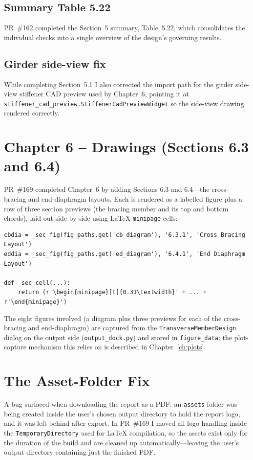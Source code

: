 \subsection{Summary Table 5.22}
PR~\#162 completed the Section~5 summary, Table~5.22, which consolidates the individual checks
into a single overview of the design's governing results.

\subsection{Girder side-view fix}
While completing Section~5.1 I also corrected the import path for the girder side-view
stiffener CAD preview used by Chapter~6, pointing it at
\texttt{stiffener\_cad\_preview.StiffenerCadPreviewWidget} so the side-view drawing rendered
correctly.

\section{Chapter 6 -- Drawings (Sections 6.3 and 6.4)}
PR~\#169 completed Chapter~6 by adding Sections 6.3 and 6.4---the cross-bracing and
end-diaphragm layouts. Each is rendered as a labelled figure plus a row of three section
previews (the bracing member and its top and bottom chords), laid out side by side using LaTeX
\texttt{minipage} cells:

\begin{lstlisting}[caption={Cross-bracing and end-diaphragm figures with side-by-side previews (\texttt{report\_generator.py}).},label={lst:secfig}]
cbdia = _sec_fig(fig_paths.get('cb_diagram'), '6.3.1', 'Cross Bracing Layout')
eddia = _sec_fig(fig_paths.get('ed_diagram'), '6.4.1', 'End Diaphragm Layout')

def _sec_cell(...):
    return (r'\begin{minipage}[t]{0.31\textwidth}' + ... + r'\end{minipage}')
\end{lstlisting}

The eight figures involved (a diagram plus three previews for each of the cross-bracing and
end-diaphragm) are captured from the \texttt{TransverseMemberDesign} dialog on the output side
(\texttt{output\_dock.py}) and stored in \texttt{figure\_data}; the plot-capture mechanism this
relies on is described in Chapter~\ref{ch:plots}.

\section{The Asset-Folder Fix}
A bug surfaced when downloading the report as a PDF: an \texttt{assets} folder was being created
inside the user's chosen output directory to hold the report logo, and it was left behind after
export. In PR~\#169 I moved all logo handling inside the \texttt{TemporaryDirectory} used for
LaTeX compilation, so the assets exist only for the duration of the build and are cleaned up
automatically---leaving the user's output directory containing just the finished PDF.

